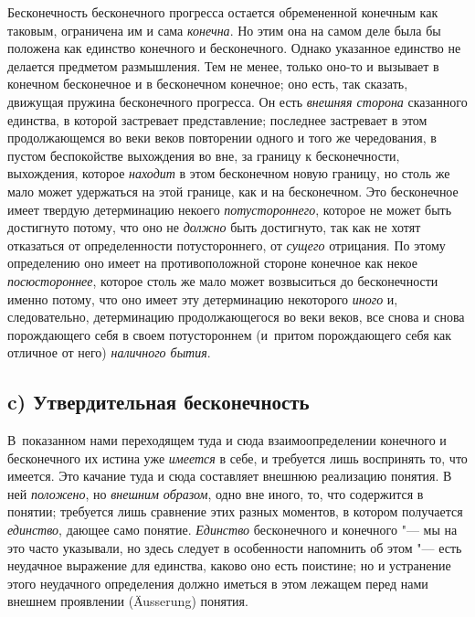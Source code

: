 Бесконечность бесконечного прогресса остается обремененной конечным как
таковым, ограничена им и сама {\em конечна}. Но этим
она на самом деле была бы положена как единство конечного и бесконечного.
Однако указанное единство не делается предметом размышления. Тем не менее,
только оно-то и вызывает в конечном бесконечное и в бесконечном конечное;
оно есть, так сказать, движущая пружина бесконечного прогресса. Он есть
{\em внешняя сторона} сказанного единства, в которой
застревает представление; последнее застревает в этом продолжающемся во
веки веков повторении одного и того же чередования, в пустом беспокойстве
выхождения во вне, за границу к бесконечности, выхождения, которое
{\em находит} в этом бесконечном новую границу, но
столь же мало может удержаться на этой границе, как и на бесконечном. Это
бесконечное имеет твердую детерминацию некоего
{\em потустороннего}, которое не может быть достигнуто
потому, что оно не {\em должно} быть достигнуто, так
как не хотят отказаться от определенности потустороннего, от
{\em сущего} отрицания. По этому определению оно имеет
на противоположной стороне конечное как некое
{\em посюстороннее}, которое столь же мало может
возвыситься до бесконечности именно потому, что оно имеет эту детерминацию
некоторого {\em иного} и, следовательно, детерминацию
продолжающегося во веки веков, все снова и снова порождающего себя в своем
потустороннем (и~притом порождающего себя как отличное от него)
{\em наличного бытия}.

\subsection[c) Утвердительная бесконечность]{c) Утвердительная бесконечность}

В~показанном нами переходящем туда и сюда взаимоопределении конечного и
бесконечного их истина уже {\em имеется} в себе, и
требуется лишь воспринять то, что имеется. Это качание туда и сюда
составляет внешнюю реализацию понятия. В ней
{\em положено}, но {\em внешним
образом}, одно вне иного, то, что содержится в понятии; требуется лишь
сравнение этих разных моментов, в котором получается
{\em единство}, дающее само понятие.
{\em Единство} бесконечного и конечного "--- мы на это
часто указывали, но здесь следует в особенности напомнить об этом "--- есть
неудачное выражение для единства, каково оно есть поистине; но и устранение
этого неудачного определения должно иметься в этом лежащем перед нами
внешнем проявлении (Äusserung) понятия.

